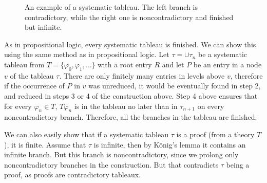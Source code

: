 \begin{figure}[t]
\centering
{}
\caption{An example of a systematic tableau. The left branch is contradictory, while the right one is noncontradictory and finished but infinite.}
\label{fig:tableau_systematic}
\end{figure}


As in propositional logic, every systematic tableau is finished. We can show this using the same method as in propositional logic. Let $\tau = \cup \tau_n$ be a systematic tableau from $T = \{\varphi_0, \varphi_1, \dots\}$ with a root entry $R$ and let $P$ be an entry in a node $v$ of the tableau $\tau$. There are only finitely many entries in levels above $v$, therefore if the occurrence of $P$ in $v$ was unreduced, it would be eventually found in step 2, and reduced in steps 3 or 4 of the construction above. Step 4 above ensures that for every $\varphi_n \in T$, $T \varphi_n$ is in the tableau no later than in $\tau_{n+1}$ on every noncontradictory branch. Therefore, all the branches in the tableau are finished.

We can also easily show that if a systematic tableau $\tau$ is a proof (from a theory $T$), it is finite. Assume that $\tau$ is infinite, then by König's lemma it contains an infinite branch. But this branch is noncontradictory, since we prolong only noncontradictory branches in the construction. But that contradicts $\tau$ being a proof, as proofs are contradictory tableaux.

